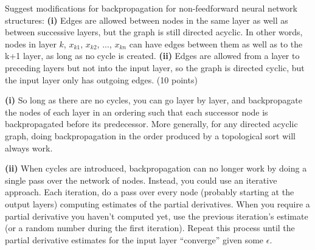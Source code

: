 \documentclass[fleqn]{homework}
\begin{document}
  \maketitle

  \begin{problem}{1}
    \begin{question}
      Suggest modifications for backpropagation for non-feedforward neural
      network structures: \textbf{(i)} Edges are allowed between nodes in the
      same layer as well as between successive layers, but the graph is still
      directed acyclic. In other words, nodes in layer $k$, $x_{k1}$, $x_{k2}$,
      ..., $x_{kn}$ can have edges between them as well as to the k+1 layer, as
      long as no cycle is created. \textbf{(ii)} Edges are allowed from a layer
      to preceding layers but not into the input layer, so the graph is directed
      cyclic, but the input layer only has outgoing edges. (10 points)
    \end{question}

    \textbf{(i)} So long as there are no cycles, you can go layer by layer, and
    backpropagate the nodes of each layer in an ordering such that each
    successor node is backpropagated before its predecessor.  More generally,
    for any directed acyclic graph, doing backpropagation in the order produced
    by a topological sort will always work.

    \textbf{(ii)} When cycles are introduced, backpropagation can no longer work
    by doing a single pass over the network of nodes.  Instead, you could use an
    iterative approach.  Each iteration, do a pass over every node (probably
    starting at the output layers) computing estimates of the partial
    derivatives.  When you require a partial derivative you haven't computed
    yet, use the previous iteration's estimate (or a random number during the
    first iteration).  Repeat this process until the partial derivative
    estimates for the input layer ``converge'' given some $\epsilon$.
  \end{problem}
\end{document}
